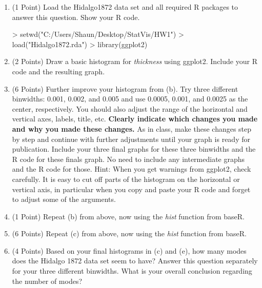 \documentclass[12pt,letterpaper,final]{article}
\begin{document}
\begin{enumerate}
\begin{enumerate}
\item (1 Point) 
Load the Hidalgo1872 data set and
all required R packages to answer this question. Show your R code.

\begin{Schunk}
\begin{Sinput}
> setwd("C:/Users/Shaun/Desktop/StatVis/HW1")
> load("Hidalgo1872.rda")
> library(ggplot2)
\end{Sinput}
\end{Schunk}


\item (2 Points) 
Draw a basic histogram for {\it thickness} using ggplot2.
Include your R code and the resulting graph.



\item (6 Points) 
Further improve your histogram from (b). 
Try three different binwidths: 0.001, 0.002, and 0.005 and use 0.0005, 0.001, and 0.0025
as the center, respectively.
You should also adjust the
range of the horizontal and vertical axes, labels, title, etc. 
{\bf Clearly indicate which changes
you made and why you made these changes.}
As in class, make these changes step by step and continue with further
adjustments until your graph is ready for publication.
Include your three final graphs for these three binwidths and the R code
for these finals graph. No need to include any intermediate graphs and the R code for those.
Hint: When you get warnings from ggplot2, check carefully. It is easy to cut off
parts of the histogram on the horizontal or vertical axis, in particular when
you copy and paste your R code and forget to adjust some of the arguments.



\item (1 Point) 
Repeat (b) from above, now using the {\it hist} function from baseR.



\item (6 Points) Repeat (c) from above, now using the {\it hist} function from baseR.



\item (4 Points)
Based on your final histograms in (c) and (e), how many modes does the Hidalgo 1872 data set
seem to have? Answer this question separately for your three different binwidths.
What is your overall conclusion regarding the number of modes?



\end{enumerate}
\end{enumerate}
\end{document}

